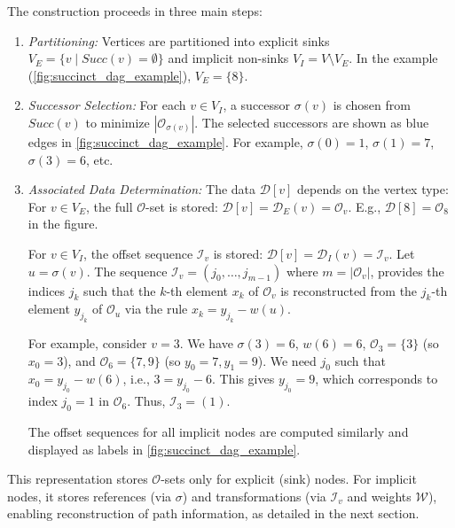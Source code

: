The construction proceeds in three main steps:

\begin{enumerate}
    \item \emph{Partitioning:} Vertices are partitioned into explicit sinks $V_E = \{ v \mid Succ(v) = \emptyset \}$ and implicit non-sinks $V_I = V \setminus V_E$. In the example (\autoref{fig:succinct_dag_example}), $V_E=\{8\}$.

    \item \emph{Successor Selection:} For each $v \in V_I$, a successor $\sigma(v)$ is chosen from $Succ(v)$ to minimize $|\mathcal{O}_{\sigma(v)}|$. The selected successors are shown as blue edges in \autoref{fig:succinct_dag_example}. For example, $\sigma(0)=1$, $\sigma(1)=7$, $\sigma(3)=6$, etc.
    \item \emph{Associated Data Determination:} The data $\mathcal{D}[v]$ depends on the vertex type:
          For $v \in V_E$, the full $\mathcal{O}$-set is stored: $\mathcal{D}[v] = \mathcal{D}_E(v) = \mathcal{O}_v$. E.g., $\mathcal{D}[8] = \mathcal{O}_8$ in the figure.

          For $v \in V_I$, the offset sequence $\mathcal{I}_v$ is stored: $\mathcal{D}[v] = \mathcal{D}_I(v) = \mathcal{I}_v$. Let $u = \sigma(v)$. The sequence $\mathcal{I}_v = (j_0, \dots, j_{m-1})$ where $m=|\mathcal{O}_v|$, provides the indices $j_k$ such that the $k$-th element $x_k$ of $\mathcal{O}_v$ is reconstructed from the $j_k$-th element $y_{j_k}$ of $\mathcal{O}_u$ via the rule $x_k = y_{j_k} - w(u)$.

          For example, consider $v=3$. We have $\sigma(3)=6$, $w(6)=6$, $\mathcal{O}_3=\{3\}$ (so $x_0=3$), and $\mathcal{O}_6=\{7, 9\}$ (so $y_0=7, y_1=9$). We need $j_0$ such that $x_0 = y_{j_0} - w(6)$, i.e., $3 = y_{j_0} - 6$. This gives $y_{j_0}=9$, which corresponds to index $j_0=1$ in $\mathcal{O}_6$. Thus, $\mathcal{I}_3 = (1)$.

          The offset sequences for all implicit nodes are computed similarly and displayed as labels in \autoref{fig:succinct_dag_example}.
\end{enumerate}

This representation stores $\mathcal{O}$-sets only for explicit (sink) nodes. For implicit nodes, it stores references (via $\sigma$) and transformations (via $\mathcal{I}_v$ and weights $\mathcal{W}$), enabling reconstruction of path information, as detailed in the next section.

